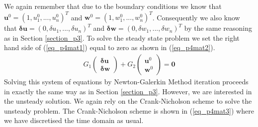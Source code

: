 \documentclass[11pt,fleqn]{article}
\theoremstyle{defstyle}
\begin{document}
We again remember that due to the boundary conditions we know that $\mathbf{u}^0 = \left(1,u^0_1,...,u^0_n \right)^T$ and $\mathbf{w}^0 = \left(1,w^0_1,...,w^0_n \right)^T$. Consequently we also know that $\mathbf{\delta u} = \left(0,\delta u_1,...,\delta u_n \right)^T$ and $\mathbf{\delta w} = \left(0,\delta w_1,...,\delta w_n \right)^T$ by the same reasoning as in Section \ref{section_p3}. To solve the steady state problem we set the right hand side of (\ref{eq_p4mat1}) equal to zero as shown in (\ref{eq_p4mat2}). 
\begin{equation}
\begin{aligned}
G_1 \begin{pmatrix}
\mathbf{\delta u} \\ \mathbf{\delta w} 
\end{pmatrix} + G_2 \begin{pmatrix}
\mathbf{u}^0 \\ \mathbf{w}^0 
\end{pmatrix}
= \mathbf{0}
\end{aligned}
\label{eq_p4mat2}
\end{equation}
Solving this system of equations by Newton-Galerkin Method iteration proceeds in exactly the same way as in Section \ref{section_p3}. However, we are interested in the unsteady solution. We again rely on the Crank-Nicholson scheme to solve the unsteady problem. The Crank-Nicholson scheme is shown in (\ref{eq_p4mat3}) where we have discretised the time domain as usual.
\end{document}
